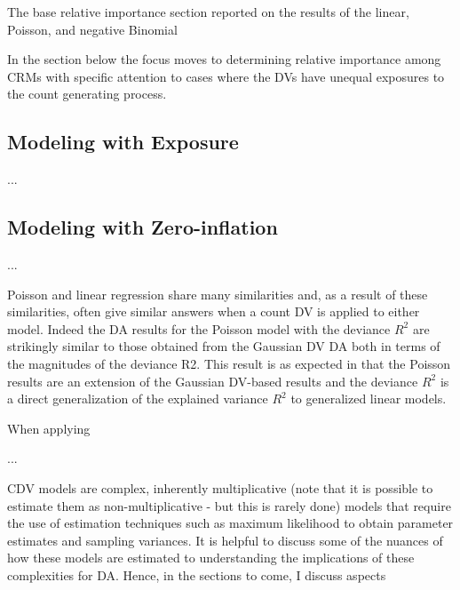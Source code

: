 \documentclass[ShortAfour,times,sageapa]{sagej}
\begin{document}
	The base relative importance section reported on the results of the linear, Poisson, and negative Binomial
	

	In the section below the focus moves to determining relative importance among CRMs with specific attention to cases where the DVs have unequal exposures to the count generating process.
	
	
	\subsection{Modeling with Exposure}
	
	...
	
	\subsection{Modeling with Zero-inflation}
	
	...
	
	
	Poisson and linear regression share many similarities and, as a result of these similarities, often give similar answers when a count DV is applied to either model.
	Indeed the DA results for the Poisson model with the deviance $R^2$ are strikingly similar to those obtained from the Gaussian DV DA both in terms of the magnitudes of the deviance R2.  
	This result is as expected in that the Poisson results are an extension of the Gaussian DV-based results and the deviance $R^2$ is a direct generalization of the explained variance $R^2$ to generalized linear models.
	
	When applying
	
	...
	
	
	CDV models are complex, inherently multiplicative (note that it is possible to estimate them as non-multiplicative - but this is rarely done) models that require the use of estimation techniques such as maximum likelihood to obtain parameter estimates and sampling variances.
	It is helpful to discuss some of the nuances of how these models are estimated to understanding the implications of these complexities for DA.
	Hence, in the sections to come, I discuss aspects 
\end{document}
